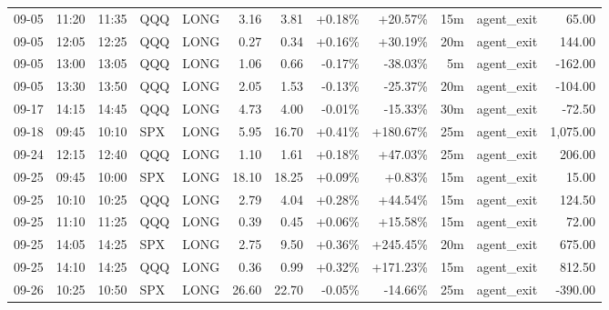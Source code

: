 \documentclass[11pt,a4paper]{article}
\begin{document}
\begin{center}
\begin{longtable}{>{\color{txtmain}}l l l l l r r r r r >{\color{txtmain}}l r}
09-05 & 11:20 & 11:35 & QQQ & LONG & 3.16 & 3.81 & \textcolor{wingreen}{+0.18\%} & \textcolor{wingreen}{+20.57\%} & 15m & agent\_exit & \textcolor{wingreen}{65.00} \\
09-05 & 12:05 & 12:25 & QQQ & LONG & 0.27 & 0.34 & \textcolor{wingreen}{+0.16\%} & \textcolor{wingreen}{+30.19\%} & 20m & agent\_exit & \textcolor{wingreen}{144.00} \\
09-05 & 13:00 & 13:05 & QQQ & LONG & 1.06 & 0.66 & \textcolor{lossred}{-0.17\%} & \textcolor{lossred}{-38.03\%} & 5m & agent\_exit & \textcolor{lossred}{-162.00} \\
09-05 & 13:30 & 13:50 & QQQ & LONG & 2.05 & 1.53 & \textcolor{lossred}{-0.13\%} & \textcolor{lossred}{-25.37\%} & 20m & agent\_exit & \textcolor{lossred}{-104.00} \\
09-17 & 14:15 & 14:45 & QQQ & LONG & 4.73 & 4.00 & \textcolor{lossred}{-0.01\%} & \textcolor{lossred}{-15.33\%} & 30m & agent\_exit & \textcolor{lossred}{-72.50} \\
09-18 & 09:45 & 10:10 & SPX & LONG & 5.95 & 16.70 & \textcolor{wingreen}{+0.41\%} & \textcolor{wingreen}{+180.67\%} & 25m & agent\_exit & \textcolor{wingreen}{1,075.00} \\
09-24 & 12:15 & 12:40 & QQQ & LONG & 1.10 & 1.61 & \textcolor{wingreen}{+0.18\%} & \textcolor{wingreen}{+47.03\%} & 25m & agent\_exit & \textcolor{wingreen}{206.00} \\
09-25 & 09:45 & 10:00 & SPX & LONG & 18.10 & 18.25 & \textcolor{wingreen}{+0.09\%} & \textcolor{wingreen}{+0.83\%} & 15m & agent\_exit & \textcolor{wingreen}{15.00} \\
09-25 & 10:10 & 10:25 & QQQ & LONG & 2.79 & 4.04 & \textcolor{wingreen}{+0.28\%} & \textcolor{wingreen}{+44.54\%} & 15m & agent\_exit & \textcolor{wingreen}{124.50} \\
09-25 & 11:10 & 11:25 & QQQ & LONG & 0.39 & 0.45 & \textcolor{wingreen}{+0.06\%} & \textcolor{wingreen}{+15.58\%} & 15m & agent\_exit & \textcolor{wingreen}{72.00} \\
09-25 & 14:05 & 14:25 & SPX & LONG & 2.75 & 9.50 & \textcolor{wingreen}{+0.36\%} & \textcolor{wingreen}{+245.45\%} & 20m & agent\_exit & \textcolor{wingreen}{675.00} \\
09-25 & 14:10 & 14:25 & QQQ & LONG & 0.36 & 0.99 & \textcolor{wingreen}{+0.32\%} & \textcolor{wingreen}{+171.23\%} & 15m & agent\_exit & \textcolor{wingreen}{812.50} \\
09-26 & 10:25 & 10:50 & SPX & LONG & 26.60 & 22.70 & \textcolor{lossred}{-0.05\%} & \textcolor{lossred}{-14.66\%} & 25m & agent\_exit & \textcolor{lossred}{-390.00} \\

\end{longtable}
\end{center}
\end{document}

